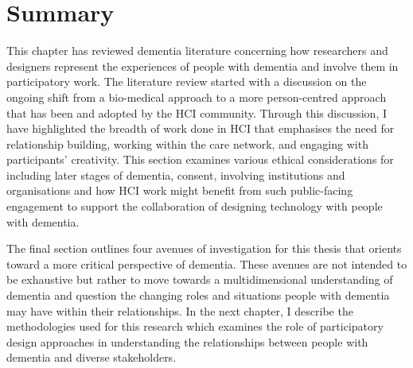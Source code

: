 \section{Summary}
\label{BL:summary}
This chapter has reviewed dementia literature concerning how researchers and designers represent the experiences of people with dementia and involve them in participatory work. The literature review started with a discussion on the ongoing shift from a bio-medical approach to a more person-centred approach that has been and adopted by the HCI community. Through this discussion, I have highlighted the breadth of work done in HCI that emphasises the need for relationship building, working within the care network, and engaging with participants' creativity. This section examines various ethical considerations for including later stages of dementia, consent, involving institutions and organisations and how HCI work might benefit from such public-facing engagement to support the collaboration of designing technology with people with dementia. 

The final section outlines four avenues of investigation for this thesis that orients toward a more critical perspective of dementia. These avenues are not intended to be exhaustive but rather to move towards a multidimensional understanding of dementia and question the changing roles and situations people with dementia may have within their relationships. In the next chapter, I describe the methodologies used for this research which examines the role of participatory design approaches in understanding the relationships between people with dementia and diverse stakeholders.
